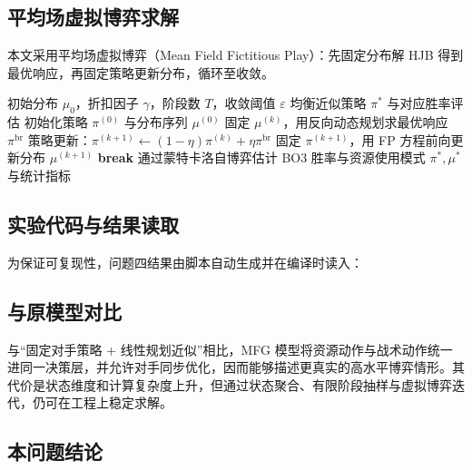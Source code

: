 \subsection{平均场虚拟博弈求解}
本文采用平均场虚拟博弈（Mean Field Fictitious Play）：先固定分布解 HJB 得到最优响应，再固定策略更新分布，循环至收敛。

\begin{algorithm}[H]
\caption{BO3 资源博弈的平均场虚拟博弈算法}
\label{alg:problem4_mfg}
\begin{algorithmic}[1]
\Require 初始分布 $\mu_0$，折扣因子 $\gamma$，阶段数 $T$，收敛阈值 $\varepsilon$
\Ensure 均衡近似策略 $\pi^*$ 与对应胜率评估
\State 初始化策略 $\pi^{(0)}$ 与分布序列 $\mu^{(0)}$
    \State 固定 $\mu^{(k)}$，用反向动态规划求最优响应 $\pi^{\mathrm{br}}$
    \State 策略更新：$\pi^{(k+1)}\leftarrow(1-\eta)\pi^{(k)}+\eta\pi^{\mathrm{br}}$
    \State 固定 $\pi^{(k+1)}$，用 FP 方程前向更新分布 $\mu^{(k+1)}$
        \State \textbf{break}
    \EndIf
\EndFor
\State 通过蒙特卡洛自博弈估计 BO3 胜率与资源使用模式
\State \Return $\pi^*,\mu^*$ 与统计指标
\end{algorithmic}
\end{algorithm}

\subsection{实验代码与结果读取}
为保证可复现性，问题四结果由脚本自动生成并在编译时读入：

\immediate{}


\subsection{与原模型对比}
与“固定对手策略 + 线性规划近似”相比，MFG 模型将资源动作与战术动作统一进同一决策层，并允许对手同步优化，因而能够描述更真实的高水平博弈情形。其代价是状态维度和计算复杂度上升，但通过状态聚合、有限阶段抽样与虚拟博弈迭代，仍可在工程上稳定求解。

\subsection{本问题结论}
\immediate{}
